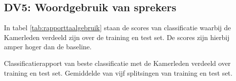 \subsection{DV5: Woordgebruik van sprekers}
In tabel \ref{tab:rapporttaalgebruik} staan de scores van classificatie waarbij de Kamerleden verdeeld zijn over de training en test set. De scores zijn hierbij amper hoger dan de baseline.
\begin{table}[H]
\caption{Classificatierapport van beste classificatie met de Kamerleden verdeeld over training en test set. Gemiddelde van vijf splitsingen van training en test set.}
\label{tab:rapporttaalgebruik}
\centering

\end{table}

